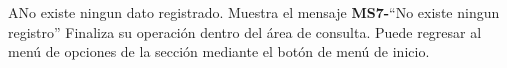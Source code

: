 \begin{UCtrayectoriaA}{A}{No existe ningun dato registrado.}
			\UCpaso[\UCactor] Muestra el mensaje {\bf MS7-}``No existe ningun registro''
			\UCpaso[\UCactor] Finaliza su operación dentro del área de consulta. 
			\UCpaso[\UCactor] Puede regresar al menú de opciones de la sección  mediante el botón de menú de inicio.
		\end{UCtrayectoriaA}
	
